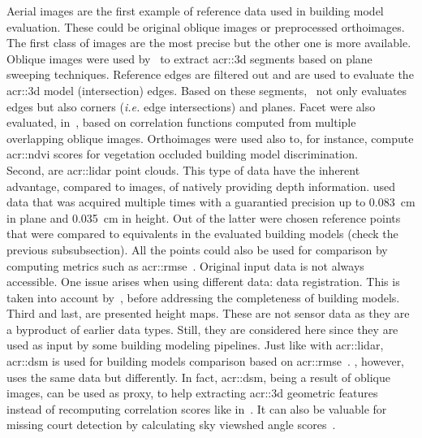             Aerial images are the first example of reference data used in building model evaluation.
            These could be original oblique images or preprocessed orthoimages.
            The first class of images are the most precise but the other one is more available.
            Oblique images were used by~\textcite{michelin2013quality} to extract \gls{acr::3d} segments based on plane sweeping techniques.
            Reference edges are filtered out and are used to evaluate the \gls{acr::3d} model (intersection) edges.
            Based on these segments,~\textcite{boudet2006supervised} not only evaluates edges but also corners (\textit{i.e.} edge intersections) and planes.
            Facet were also evaluated, in~\parencite{boudet2006supervised}, based on correlation functions computed from multiple overlapping oblique images.
            Orthoimages were used also to, for instance, compute \gls{acr::ndvi} scores for vegetation occluded building model discrimination.\\
            Second, are \gls{acr::lidar} point clouds.
            This type of data have the inherent advantage, compared to images, of natively providing depth information.
            \textcite{kaartinen2005accuracy} used data that was acquired multiple times with a guarantied precision up to \SI{0.083}{\cm} in plane and \SI{0.035}{\cm} in height.
            Out of the latter were chosen reference points that were compared to equivalents in the evaluated building models (check the previous subsubsection).
            All the points could also be used for comparison by computing metrics such as \gls{acr::rmse}~\parencite{lafarge_ijcv12,zhu2018large}.
            Original input data is not always accessible.
            One issue arises when using different data: data registration.
            This is taken into account by~\textcite{akca2010quality}, before addressing the completeness of building models.\\
            Third and last, are presented height maps.
            These are not sensor data as they are a byproduct of earlier data types.
            Still, they are considered here since they are used as input by some building modeling pipelines.
            Just like with \gls{acr::lidar}, \gls{acr::dsm} is used for building models comparison based on \gls{acr::rmse}~\parencite{zeng2018neural}.
            \textcite{michelin2013quality}, however, uses the same data but differently.
            In fact, \gls{acr::dsm}, being a result of oblique images, can be used as proxy, to help extracting \gls{acr::3d} geometric features instead of recomputing correlation scores like in~\parencite{boudet2006supervised}.
            It can also be valuable for missing court detection by calculating sky viewshed angle scores~\parencite{michelin2013quality}.

